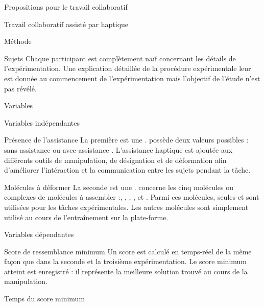 \documentclass[myfrancais]{mythesis}
\begin{document}
\begin{mypart}{Propositions pour le travail collaboratif}
\begin{mychapter}{Travail collaboratif assisté par haptique}
\begin{mysection}{Méthode}
\begin{mysubsection}{Sujets}
					Chaque participant est complètement naïf concernant les détails de l'expérimentation.
					Une explication détaillée de la procédure expérimentale leur est donnée au commencement de l'expérimentation mais l'objectif de l'étude n'est pas révélé.
				\end{mysubsection}
				\begin{mysubsection}{Variables}
					\begin{mysubsubsection}{Variables indépendantes}
						\begin{myparagraph}{ Présence de l'assistance}
							La première  est une .
							 possède deux valeurs possibles : \og sans assistance \fg ou \og avec assistance \fg.
							L'assistance haptique est ajoutée aux différents outils de manipulation, de désignation et de déformation afin d'améliorer l'intéraction et la communication entre les sujets pendant la tâche.
						\end{myparagraph}
						\begin{myparagraph}{ Molécules à déformer}
							La seconde  est une \myglos{glo-VariableIntraSujets}.
							 concerne les cinq molécules ou complexes de molécules à assembler :, \og \myTRPCAGE \fg, \og \myPrion \fg, \og \myUbiquitin \fg, \og \myTRPZIPPER \fg et \og \myNusENusG \fg.
							Parmi ces molécules, seules \myUbiquitin et \myNusENusG sont utilisées pour les tâches expérimentales.
							Les autres molécules sont simplement utilisé au cours de l'entraînement sur la plate-forme.
						\end{myparagraph}
					\end{mysubsubsection}
					\begin{mysubsubsection}{Variables dépendantes}
						\begin{myparagraph}{ Score de ressemblance minimum}
							Un score  est calculé en temps-réel de la même façon que dans la seconde et la troisième expérimentation.
							Le score minimum atteint est enregistré : il représente la meilleure solution trouvé au cours de la manipulation.
						\end{myparagraph}
						\begin{myparagraph}{ Temps du score \myacronl{acr-RMSD} minimum}

\end{myparagraph}
\end{mysubsubsection}
\end{mysubsection}
\end{mysection}
\end{mychapter}
\end{mypart}
\end{document}
